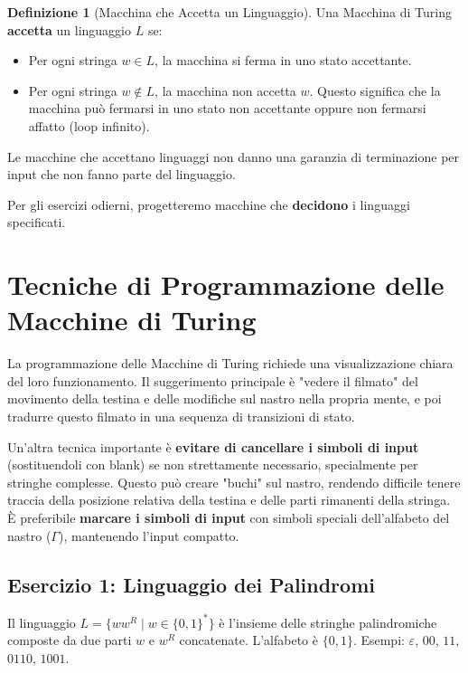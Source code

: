 \documentclass[a4paper]{article}
\theoremstyle{definition} %
\newtheorem{definition}{Definizione}
\begin{document}
\begin{definition}[Macchina che Accetta un Linguaggio]
Una Macchina di Turing \textbf{accetta} un linguaggio $L$ se:
\begin{itemize}
    \item Per ogni stringa $w \in L$, la macchina si ferma in uno stato accettante.
    \item Per ogni stringa $w \notin L$, la macchina non accetta $w$. Questo significa che la macchina può fermarsi in uno stato non accettante oppure non fermarsi affatto (loop infinito).
\end{itemize}
Le macchine che accettano linguaggi non danno una garanzia di terminazione per input che non fanno parte del linguaggio.

Per gli esercizi odierni, progetteremo macchine che \textbf{decidono} i linguaggi specificati.
\end{definition}

\section{Tecniche di Programmazione delle Macchine di Turing}

La programmazione delle Macchine di Turing richiede una visualizzazione chiara del loro funzionamento. Il suggerimento principale è "vedere il filmato" del movimento della testina e delle modifiche sul nastro nella propria mente, e poi tradurre questo filmato in una sequenza di transizioni di stato.

Un'altra tecnica importante è \textbf{evitare di cancellare i simboli di input} (sostituendoli con blank) se non strettamente necessario, specialmente per stringhe complesse. Questo può creare "buchi" sul nastro, rendendo difficile tenere traccia della posizione relativa della testina e delle parti rimanenti della stringa. È preferibile \textbf{marcare i simboli di input} con simboli speciali dell'alfabeto del nastro ($\Gamma$), mantenendo l'input compatto.

\subsection{Esercizio 1: Linguaggio dei Palindromi}
Il linguaggio $L = \{ww^R \mid w \in \{0,1\}^*\}$ è l'insieme delle stringhe palindromiche composte da due parti $w$ e $w^R$ concatenate. L'alfabeto è $\{0,1\}$. Esempi: $\varepsilon$, $00$, $11$, $0110$, $1001$.
\end{document}

